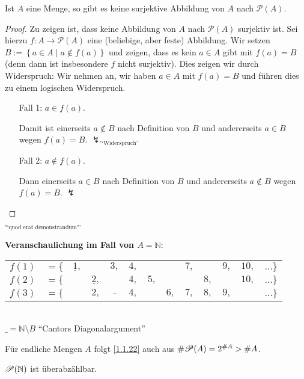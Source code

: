 \documentclass[../../main.tex]{subfiles}
\begin{document}
\begin{sat}\label{1.1.22}
Ist $A$ eine Menge, so gibt es keine surjektive Abbildung von $A$ nach $\mathcal{P}(A)$.
\end{sat} 
\begin{proof}
Zu zeigen ist, dass keine Abbildung von $A$ nach $\mathcal{P}
(A)$ surjektiv ist. Sei hierzu $f\colon A\rightarrow\mathcal{P}(A)$ eine (beliebige, aber feste) Abbildung. Wir setzen $B:=\left\{a\in A\mid a\notin f(a)\right\}$ und zeigen, dass es kein $a\in A$ gibt mit $f(a)=B$ (denn dann ist insbesondere $f$ nicht surjektiv). Dies zeigen wir durch Widerspruch: Wir nehmen an, wir haben $a\in A$ mit $f(a) =B$ und führen dies zu einem logischen Widerspruch.
\begin{itemize}
\item[Fall 1:] $a\in f(a)$.

Damit ist einerseits $a\notin B$ nach Definition von $B$ und andererseits $a\in B$ wegen $f(a)=B$.
$\lightning_{\text{"`Widerspruch\"'}}$
\item[Fall 2:] $a\notin f(a)$.

Dann einerseits $a\in B$ nach Definition von $B$ und andererseits $a\notin B$ wegen $f(a) = B$. $\lightning$
\end{itemize}
\end{proof}
\vspace{-3em}
\begin{flushright}
$_{\text{"`quod erat demonstrandum"'}}$
\end{flushright}

\noindent
\textbf{Veranschaulichung im Fall von $A=\mathbb{N}$}:\\
\begin{tabular}{ccccccccccccc}
$f(1)$ & $= \{$ & $\underline{1},$ &    & $3,$ & $4,$ &  &  & $7,$ &  & $9,$ & $10,$ & $\ldots\}$\\
$f(2)$ & $= \{$ &    & $\underline{2},$ &  & $4,$ & $5,$ &  &  & $8,$ &  & $10,$ & $\ldots\}$\\
$f(3)$ & $= \{$ &    & $2,$ & $\_$ & $4,$ &  & $6,$ & $7,$ & $8,$ & $9,$ &  & $\ldots\}$
\end{tabular}\\
$\_=\mathbb{N}\setminus B$ "`Cantors Diagonalargument"'

\begin{bem}\label{1.1.23}
Für endliche Mengen $A$ folgt \ref{1.1.22} auch aus $\# \mathcal P(A)=2^{\# A}>\# A$.
\end{bem}

\begin{kor}\label{1.1.24}
$\mathcal P(\mathbb N)$ ist überabzählbar.
\end{kor}
\end{document}
